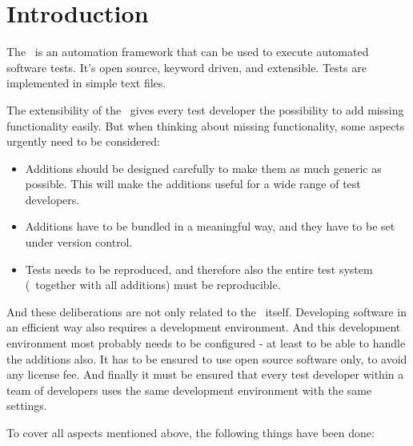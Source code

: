 %
%
%

\chapter{Introduction}

The \rfwcore\ is an automation framework that can be used to execute automated software tests. It's open source, keyword driven, and extensible.
Tests are implemented in simple text files.

The extensibility of the \rfwcore\ gives every test developer the possibility to add missing functionality easily. But when thinking about missing
functionality, some aspects urgently need to be considered:

\begin{itemize}
   \item Additions should be designed carefully to make them as much generic as possible. This will make the additions useful for a wide range of test developers.
   \item Additions have to be bundled in a meaningful way, and they have to be set under version control.
   \item Tests needs to be reproduced, and therefore also the entire test system (\rfwcore\ together with all additions) must be reproducible.
\end{itemize}

And these deliberations are not only related to the \rfwcore\ itself. Developing software in an efficient way also requires a development environment.
And this development environment most probably needs to be configured - at least to be able to handle the additions also.
It has to be ensured to use open source software only, to avoid any license fee.
And finally it must be ensured that every test developer within a team of developers uses the same development environment with the same settings.

To cover all aspects mentioned above, the following things have been done:


